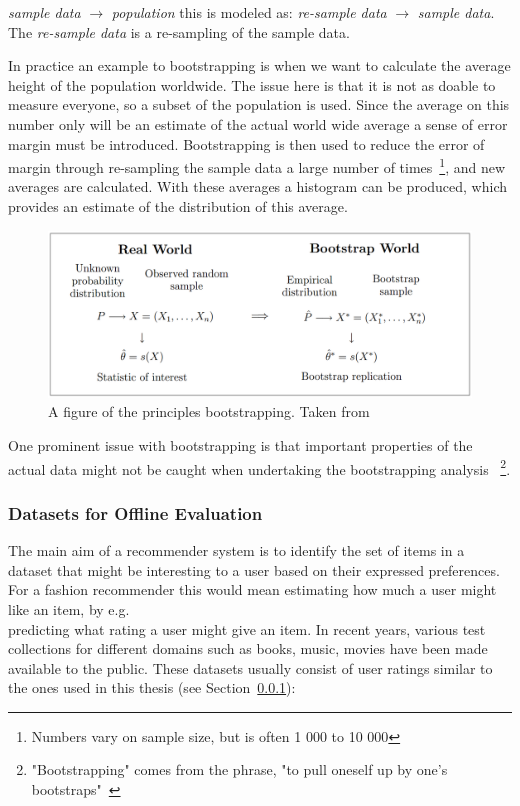 \emph{sample data} $\rightarrow$ \emph{population} this is modeled as:
\emph{re-sample data} $\rightarrow$ \emph{sample data}.
The \emph{re-sample data} is a re-sampling of the sample data.

In practice an example to bootstrapping is when we want to calculate the
average height of the population worldwide.  The issue here is that it is not
as doable to measure everyone, so a subset of the population is used.  Since
the average on this number only will be an estimate of the actual world wide
average a sense of error margin must be introduced.  Bootstrapping is then used
to reduce the error of margin through re-sampling the sample data a large
number of times~\footnote{Numbers vary on sample size, but is often 1 000 to 10
000}, and new averages are calculated.  With these averages a histogram can be
produced, which provides an estimate of the distribution of this average.

\begin{figure}[H]
    \includegraphics[scale=0.5]{image/bootstrap.png}
    \centering
    \caption[Bootstrapping principles]{A figure of the principles bootstrapping. Taken from~\cite{Eichler2003}}
    \label{figure:bootstrapping}
\end{figure}

One prominent issue with bootstrapping is that important properties of the
actual data might not be caught when undertaking the bootstrapping analysis
~\footnote{"Bootstrapping" comes from the phrase, "to pull oneself up by one's
bootstraps"~\cite{bootstrapSaying1843}}.

\subsubsection{Datasets for Offline Evaluation}
The main aim of a recommender system is to identify the set of items in a
dataset that might be interesting to a user based on their expressed
preferences. For a fashion recommender this would mean estimating how much a
user might like an item, by e.g.\\ predicting what rating a user might give an
item. In recent years, various test collections for different domains such as
books, music, movies have been made available to the public. These datasets
usually consist of user ratings similar to the ones used in this thesis (see
Section~\ref{}):

